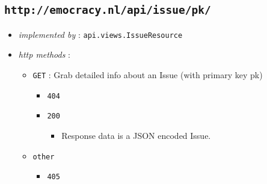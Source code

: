 \documentclass[a4paper]{report}
\begin{document}
\subsection{\texttt{http://emocracy.nl/api/issue/\textsf{pk}/}}
\begin{itemize}
    \item{\textsl{implemented by} : \texttt{api.views.IssueResource}}
    \item{\textsl{http methods} :
        \begin{itemize}
            \item{\texttt{GET} : Grab detailed info about an Issue (with primary key \textsf{pk})
                \begin{itemize}
                    \item{\texttt{404}}
                    \item{\texttt{200}
                    \begin{itemize}
                        \item{Response data is a JSON encoded Issue.}
                    \end{itemize}
                    }
                \end{itemize}
            }
            \item{\texttt{other}
                \begin{itemize}
                    \item{\texttt{405}}
                \end{itemize}
            }
        \end{itemize}
    }
\end{itemize}
\end{document}
